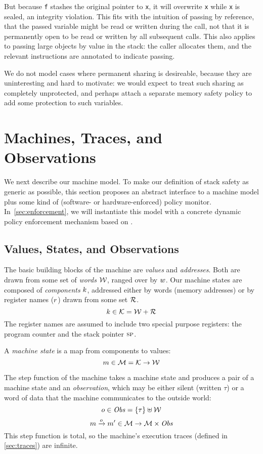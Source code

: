 \documentclass[acmsmall,review,anonymous]{acmart}\settopmatter{printfolios=true,printccs=false,printacmref=false}
\begin{document}
But because {\tt f} stashes the original pointer to {\tt x}, it will overwrite {\tt x} while
{\tt x} is sealed, an integrity violation. This fits with the intuition of passing by reference,
that the passed variable might be read or written during the call, not that it is permanently
open to be read or written by all subsequent calls. This also applies to passing large objects
by value in the stack: the caller allocates them, and the relevant instructions are annotated to
indicate passing.

We do not model cases where permanent sharing is desireable, because they are uninteresting
and hard to motivate: we would expect to treat such sharing as completely unprotected, and
perhaps attach a separate memory safety policy to add some protection to such variables.

\section{Machines, Traces, and Observations}
\label{sec:prelim}

We next describe our machine model. To make our definition of stack safety
as generic as possible, this section proposes an abstract interface to a
machine model plus some kind of (software- or hardware-enforced) policy monitor.
In~\cref{sec:enforcement}, we will instantiate this model with a concrete dynamic
policy enforcement mechanism based on \citet{DBLP:conf/sp/RoesslerD18}.

\subsection{Values, States, and Observations}

The basic building blocks of the machine are {\em values} and {\em addresses}.
Both are drawn from some set of {\em words} \(\WORDS\), ranged over by \(\word\).
%
Our machine states are composed of {\em components} \(\component\), addressed either by
words (memory addresses) or by register names (\(\reg\)) drawn from some set
\(\REGS\).
%
    \[\component \in \COMPONENTS = \WORDS + \REGS \]
%
The register names are assumed to include two special purpose registers: the
program counter {\PCname} and the stack pointer \(\SP\).

A {\em machine state} is a map from components to values:
%
\[\mach \in \MACHS = \COMPONENTS \rightarrow \WORDS\]

The step function of the machine takes a machine state and produces a
pair of a machine state and an {\em observation}, which may be either
silent (written \(\tau\)) or a word of data that the machine
communicates to the outside world:
\ifaftersubmission{}\fi
%
\[\obs \in \OBSS = \{\tau\} \uplus \WORDS\]
\[\mach \stepstoobs[\obs] \mach' \in \MACHS \rightarrow \MACHS \times \OBSS \]
%
This step function is total, so the machine's execution traces
(defined in \cref{sec:traces}) are infinite.
\end{document}
